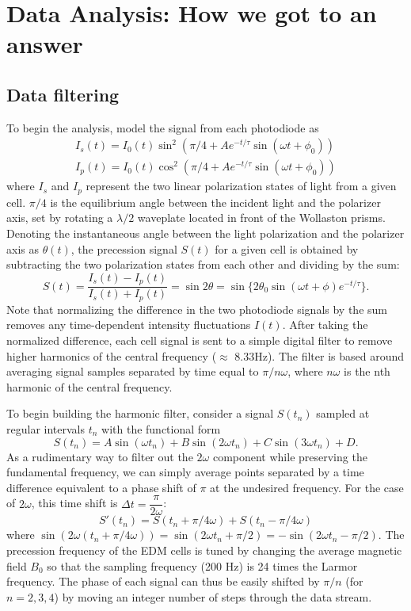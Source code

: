\documentclass [10pt, twoside] {uwthesis}[2012/04/02]
\begin{document}
\chapter{Data Analysis: How we got to an answer}
\section{Data filtering}
\label{Digital_filter}
To begin the analysis, model the signal from each photodiode as 
\begin{align}
I_s(t) = I_0(t) \sin^2(\pi/4 + Ae^{-t/\tau}\sin(\omega t + \phi_0)) \\
I_p(t) = I_0(t) \cos^2(\pi/4 + Ae^{-t/\tau}\sin(\omega t + \phi_0)) 
\end{align}
where $I_s$ and $I_p$ represent the two linear polarization states of light from a given cell. $\pi/4$ is the equilibrium angle between the incident light and the polarizer axis, set by rotating a $\lambda/2$ waveplate located in front of the Wollaston prisms. Denoting the instantaneous angle between the light polarization and the polarizer axis as $\theta(t)$, the precession signal $S(t)$ for a given cell is obtained by subtracting the two polarization states from each other and dividing by the sum:
\begin{equation}
S(t) = \frac{I_s(t)-I_p(t)}{I_s(t)+I_p(t)} = \sin{2\theta} = \sin\lbrace 2\theta_0 \sin(\omega t + \phi) e^{-t/\tau}\rbrace. 
\end{equation}
Note that normalizing the difference in the two photodiode signals by the sum removes any time-dependent intensity fluctuations $I(t)$. After taking the normalized difference, each cell signal is sent to a simple digital filter to remove higher harmonics of the central frequency ($\approx$ 8.33Hz). The filter is based around averaging signal samples separated by time equal to $\pi/n\omega$, where $n\omega$ is the nth harmonic of the central frequency.

To begin building the harmonic filter, consider a signal $S(t_n)$ sampled at regular intervals $t_n$ with the functional form
\begin{equation} \label{S}
S(t_n) = A \sin(\omega t_n) + B \sin(2\omega t_n) + C \sin(3\omega t_n) + D. 
\end{equation}
As a rudimentary way to filter out the $2\omega$ component while preserving the fundamental frequency, we can simply average points separated by a time difference equivalent to a phase shift of $\pi$ at the undesired frequency. For the case of $2\omega$, this time shift is $\Delta t = \dfrac{\pi}{2\omega}$: 
\begin{equation}
S'(t_n) = S(t_n + \pi/4\omega) + S(t_n - \pi/4\omega)
\end{equation}
where $\sin(2\omega (t_n + \pi/4\omega)) = \sin(2\omega t_n + \pi/2) = - \sin(2\omega t_n - \pi/2).$ The precession frequency of the EDM cells is tuned by changing the average magnetic field $B_0$ so that the sampling frequency (200 Hz) is 24 times the Larmor frequency. The phase of each signal can thus be easily shifted by $\pi/n $ (for $n=2,3,4$) by moving an integer number of steps through the data stream.
\end{document}
